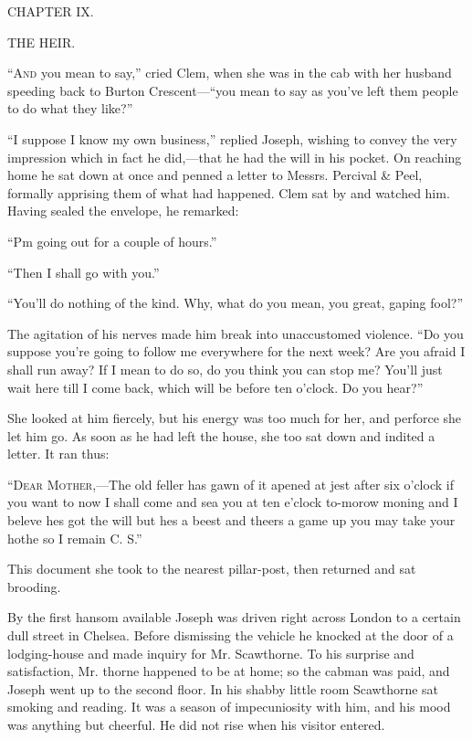 {}

{CHAPTER IX.}

THE HEIR.

\textsc{``And} you mean to say,'' cried Clem, when she was in the cab
with her husband speeding back to Burton Crescent---``you mean to say as
you've left them people to do what they like?''

``I suppose I know my own business,'' replied Joseph, wishing to convey
the very impression which in fact he did,---that he had the will in his
pocket. On reaching home he sat down at once and penned a letter to
Messrs. Percival \& Peel, formally apprising them of what had happened.
Clem sat by and watched him. Having sealed the envelope, he remarked:

``Pm going out for a couple of hours.''

``Then I shall go with you.''

``You'll do nothing of the kind. Why, what do you mean, you great,
gaping fool?''

The agitation of his nerves made him break {}into unaccustomed violence.
``Do you suppose you're going to follow me everywhere for the next week?
Are you afraid I shall run away? If I mean to do so, do you think you
can stop me? You'll just wait here till I come back, which will be
before ten o'clock. Do you hear?''

She looked at him fiercely, but his energy was too much for her, and
perforce she let him go. As soon as he had left the house, she too sat
down and indited a letter. It ran thus:

``\textsc{Dear Mother},---The old feller has gawn of it apened at jest
after six o'clock if you want to now I shall come and sea you at ten
e'clock to-morow moning and I beleve hes got the will but hes a beest
and theers a game up you may take your hothe so I remain C. S.''

This document she took to the nearest pillar-post, then returned and sat
brooding.

By the first hansom available Joseph was driven right across London to a
certain dull street in Chelsea. Before dismissing the vehicle he knocked
at the door of a lodging-house and made inquiry for Mr. Scawthorne. To
his surprise and satisfaction, Mr. {}thorne happened to be at home; so
the cabman was paid, and Joseph went up to the second floor. In his
shabby little room Scawthorne sat smoking and reading. It was a season
of impecuniosity with him, and his mood was anything but cheerful. He
did not rise when his visitor entered.

